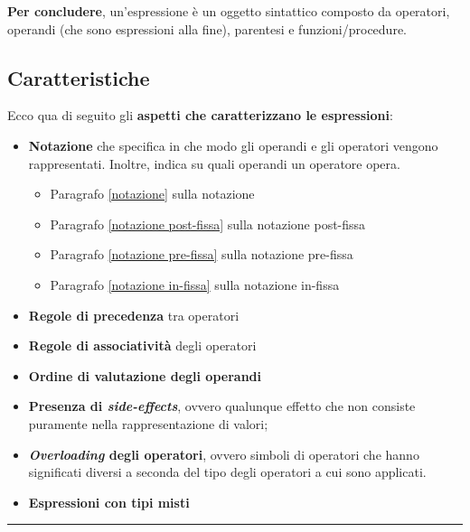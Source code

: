 \documentclass[a4paper]{article}
\newcommand{\longline}{\noindent\rule{\textwidth}{0.4pt}}
\begin{document}
	\noindent
	\textbf{Per concludere}, un'espressione è un oggetto sintattico composto da operatori, operandi (che sono espressioni alla fine), parentesi e funzioni/procedure.\newpage
	
	\subsection{Caratteristiche}
	
	Ecco qua di seguito gli \textbf{aspetti che caratterizzano le espressioni}:
	\begin{itemize}
		\item \textcolor{Red3}{\textbf{Notazione}} che specifica in che modo gli operandi e gli operatori vengono rappresentati. Inoltre, indica su quali operandi un operatore opera.
		\begin{itemize}
			\item Paragrafo \ref{notazione} sulla notazione
			\item Paragrafo \ref{notazione post-fissa} sulla notazione post-fissa
			\item Paragrafo \ref{notazione pre-fissa} sulla notazione pre-fissa
			\item Paragrafo \ref{notazione in-fissa} sulla notazione in-fissa
		\end{itemize}
		
		\item \textcolor{Red3}{\textbf{Regole di precedenza}} tra operatori
		
		\item \textcolor{Red3}{\textbf{Regole di associatività}} degli operatori
		
		\item \textcolor{Red3}{\textbf{Ordine di valutazione degli operandi}}
		
		\item \textcolor{Red3}{\textbf{Presenza di \emph{side-effects}}}, ovvero qualunque effetto che non consiste puramente nella rappresentazione di valori;
		
		\item \textcolor{Red3}{\textbf{\emph{Overloading} degli operatori}}, ovvero simboli di operatori che hanno significati diversi a seconda del tipo degli operatori a cui sono applicati.
		
		\item \textcolor{Red3}{\textbf{Espressioni con tipi misti}}
	\end{itemize}
	
	\longline
	
\end{document}
